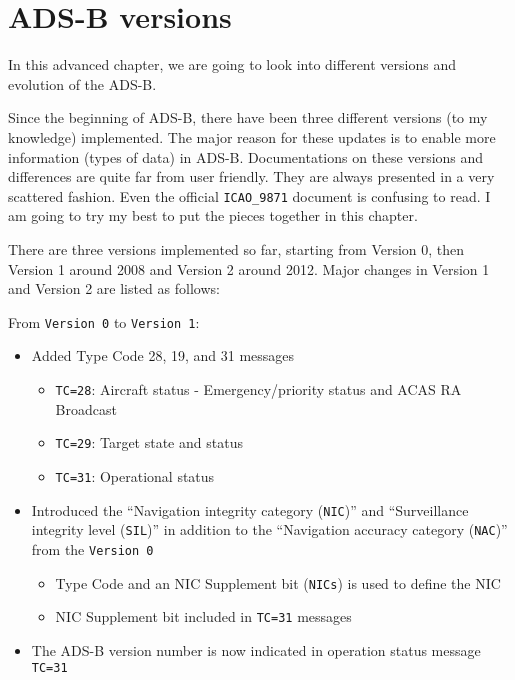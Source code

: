 \section{ADS-B versions}\label{ads-b-versions}

In this advanced chapter, we are going to look into different versions and evolution of the ADS-B.

Since the beginning of ADS-B, there have been three different versions (to my knowledge) implemented. The major reason for these updates is to enable more information (types of data) in ADS-B. Documentations on these versions and differences are quite far from user friendly. They are always presented in a very scattered fashion. Even the official \texttt{ICAO\_9871} document is confusing to read. I am going to try my best to put the pieces together in this chapter.

There are three versions implemented so far, starting from Version 0, then Version 1 around 2008 and Version 2 around 2012. Major changes in Version 1 and Version 2 are listed as follows:

From \texttt{Version\ 0} to \texttt{Version\ 1}:

\begin{itemize}
\item
  Added Type Code 28, 19, and 31 messages

  \begin{itemize}
    \item
    \texttt{TC=28}: Aircraft status - Emergency/priority status and ACAS
    RA Broadcast
  \item
    \texttt{TC=29}: Target state and status
  \item
    \texttt{TC=31}: Operational status
  \end{itemize}
\item
  Introduced the ``Navigation integrity category (\texttt{NIC})'' and   ``Surveillance integrity level (\texttt{SIL})'' in addition to the   ``Navigation accuracy category (\texttt{NAC})'' from the \texttt{Version\ 0}

  \begin{itemize}
    \item
    Type Code and an NIC Supplement bit (\texttt{NICs}) is used to
    define the NIC
  \item
    NIC Supplement bit included in \texttt{TC=31} messages
  \end{itemize}
\item
  The ADS-B version number is now indicated in operation status message
  \texttt{TC=31}
\end{itemize}

